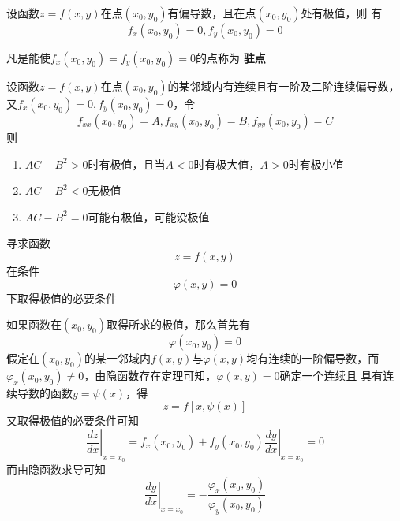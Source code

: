 \documentclass[11pt]{article}
\begin{document}
\begin{theorem}[必要条件]
设函数\(z=f(x,y)\)在点\((x_0,y_0)\)有偏导数，且在点\((x_0,y_0)\)处有极值，则
有
\begin{equation*}
f_x(x_0,y_0)=0,f_y(x_0,y_0)=0
\end{equation*}
\end{theorem}

凡是能使\(f_x(x_0,y_0)=f_y(x_0,y_0)=0\)的点称为 \textbf{驻点}

\begin{definition}[充分条件]
设函数\(z=f(x,y)\)在点\((x_0,y_0)\)的某邻域内有连续且有一阶及二阶连续偏导数，
又\(f_x(x_0,y_0)=0,f_y(x_0,y_0)=0\)，令
\begin{equation*}
f_{xx}(x_0,y_0)=A,f_{xy}(x_0,y_0)=B,f_{yy}(x_0,y_0)=C
\end{equation*}
则
\begin{enumerate}
\item \(AC-B^2>0\)时有极值，且当\(A<0\)时有极大值，\(A>0\)时有极小值
\item \(AC-B^2<0\)无极值
\item \(AC-B^2=0\)可能有极值，可能没极值
\end{enumerate}
\end{definition}

寻求函数
\begin{equation*}
z=f(x,y)
\end{equation*}
在条件
\begin{equation*}
\varphi(x,y)=0
\end{equation*}
下取得极值的必要条件

如果函数在\((x_0,y_0)\)取得所求的极值，那么首先有
\begin{equation*}
\varphi(x_0,y_0)=0
\end{equation*}
假定在\((x_0,y_0)\)的某一邻域内\(f(x,y)\)与\(\varphi(x,y)\)均有连续的一阶偏导数，而
\(\varphi_x(x_0,y_0)\neq0\)，由隐函数存在定理可知，\(\varphi(x,y)=0\)确定一个连续且
具有连续导数的函数\(y=\psi(x)\)，得
\begin{equation*}
z=f[x,\psi(x)]
\end{equation*}
又取得极值的必要条件可知
\begin{equation*}
\left.\frac{dz}{dx}\right\rvert_{x=x_0}=f_x(x_0,y_0)+f_y(x_0,y_0)
\left.\frac{dy}{dx}\right\rvert_{x=x_0}=0
\end{equation*}
而由隐函数求导可知
\begin{equation*}
\left.\frac{dy}{dx}\right\rvert_{x=x_0}=
-\frac{\varphi_x(x_0,y_0)}{\varphi_y(x_0,y_0)}
\end{equation*}
\end{document}
